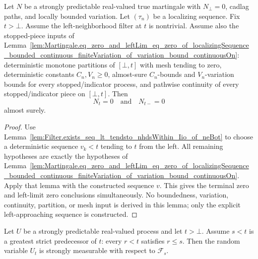 \begin{lemma}\label{lem:Martingale.eq_zero_and_leftLim_eq_zero_of_localizingSequence_bounded_continuous_finiteVariation_of_variation_bound_continuousOn_of_neBot_left}
Let \(N\) be a strongly predictable real-valued true martingale with
\(N_\bot=0\), cadlag paths, and locally bounded variation.  Let
\((\tau_n)\) be a localizing sequence.  Fix \(t>\bot\).  Assume the
left-neighborhood filter at \(t\) is nontrivial.  Assume also the stopped-piece
inputs of
Lemma~\ref{lem:Martingale.eq_zero_and_leftLim_eq_zero_of_localizingSequence_bounded_continuous_finiteVariation_of_variation_bound_continuousOn}:
deterministic monotone partitions of \([\bot,t]\) with mesh tending to zero,
deterministic constants \(C_n,V_n\ge0\), almost-sure \(C_n\)-bounds and
\(V_n\)-variation bounds for every stopped/indicator process, and pathwise
continuity of every stopped/indicator piece on \([\bot,t]\).  Then
\[
  N_t=0
  \quad\text{and}\quad
  N_{t-}=0
\]
almost surely.
\end{lemma}

\begin{proof}
Use
Lemma~\ref{lem:Filter.exists_seq_lt_tendsto_nhdsWithin_Iio_of_neBot}
to choose a deterministic sequence \(v_k<t\) tending to \(t\) from the left.
All remaining hypotheses are exactly the hypotheses of
Lemma~\ref{lem:Martingale.eq_zero_and_leftLim_eq_zero_of_localizingSequence_bounded_continuous_finiteVariation_of_variation_bound_continuousOn}.
Apply that lemma with the constructed sequence \(v\).  This gives the terminal
zero and left-limit zero conclusions simultaneously.  No boundedness,
variation, continuity, partition, or mesh input is derived in this lemma; only
the explicit left-approaching sequence is constructed.
\end{proof}

\begin{lemma}\label{lem:IsStronglyPredictable.stronglyMeasurable_left_isolated_past}
Let \(U\) be a strongly predictable real-valued process and let \(t>\bot\).
Assume \(s<t\) is a greatest strict predecessor of \(t\): every \(r<t\)
satisfies \(r\le s\).  Then the random variable \(U_t\) is strongly
measurable with respect to \(\mathcal F_s\).
\end{lemma}

